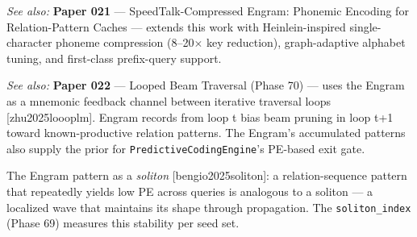 \textit{See also:} \textbf{Paper 021} --- SpeedTalk-Compressed Engram: Phonemic Encoding for Relation-Pattern Caches --- extends this work with Heinlein-inspired single-character phoneme compression (8--20$\times$ key reduction), graph-adaptive alphabet tuning, and first-class prefix-query support.

\textit{See also:} \textbf{Paper 022} --- Looped Beam Traversal (Phase 70) --- uses the Engram as a mnemonic feedback channel between iterative traversal loops [zhu2025loooplm]. Engram records from loop t bias beam pruning in loop t+1 toward known-productive relation patterns. The Engram's accumulated patterns also supply the prior for \texttt{PredictiveCodingEngine}'s PE-based exit gate.

The Engram pattern as a \textit{soliton} [bengio2025soliton]: a relation-sequence pattern that repeatedly yields low PE across queries is analogous to a soliton --- a localized wave that maintains its shape through propagation. The \texttt{soliton\_index} (Phase 69) measures this stability per seed set.